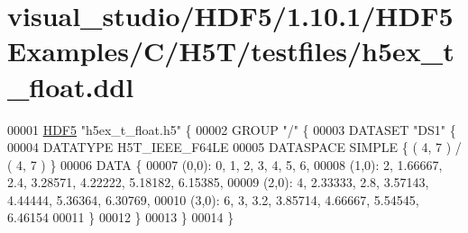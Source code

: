 \hypertarget{visual__studio_2_h_d_f5_21_810_81_2_h_d_f5_examples_2_c_2_h5_t_2testfiles_2h5ex__t__float_8ddl_source}{}\section{visual\+\_\+studio/\+H\+D\+F5/1.10.1/\+H\+D\+F5\+Examples/\+C/\+H5\+T/testfiles/h5ex\+\_\+t\+\_\+float.ddl}
\label{visual__studio_2_h_d_f5_21_810_81_2_h_d_f5_examples_2_c_2_h5_t_2testfiles_2h5ex__t__float_8ddl_source}

\begin{DoxyCode}
00001 \hyperlink{namespace_h_d_f5}{HDF5} \textcolor{stringliteral}{"h5ex\_t\_float.h5"} \{
00002 GROUP \textcolor{stringliteral}{"/"} \{
00003    DATASET \textcolor{stringliteral}{"DS1"} \{
00004       DATATYPE  H5T\_IEEE\_F64LE
00005       DATASPACE  SIMPLE \{ ( 4, 7 ) / ( 4, 7 ) \}
00006       DATA \{
00007       (0,0): 0, 1, 2, 3, 4, 5, 6,
00008       (1,0): 2, 1.66667, 2.4, 3.28571, 4.22222, 5.18182, 6.15385,
00009       (2,0): 4, 2.33333, 2.8, 3.57143, 4.44444, 5.36364, 6.30769,
00010       (3,0): 6, 3, 3.2, 3.85714, 4.66667, 5.54545, 6.46154
00011       \}
00012    \}
00013 \}
00014 \}
\end{DoxyCode}
